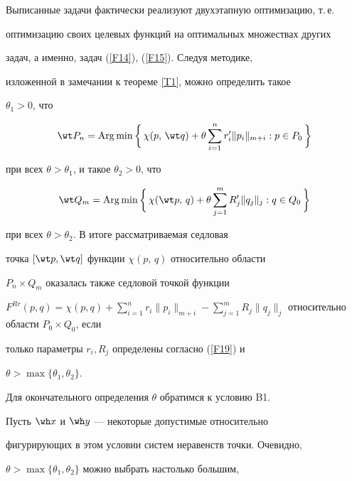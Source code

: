 Выписанные задачи фактически реализуют двухэтапную оптимизацию, т.\,е.{}


оптимизацию своих целевых функций на оптимальных множествах других


задач, а именно, задач (\ref{F14}), (\ref{F15}). Следуя методике,\


изложенной в замечании к теореме \ref{T1}, можно определить такое


$\theta_1>0$, что


\begin{equation}


\label{F17}


\wt P_n=\Arg\min\bigg\{\, \chi(p,\,\wt q)+\theta \sum^n_{i=1}


r'_i\| p_i\|_{m+i}: p\in P_0\,\bigg\}


\end{equation}


при всех $\theta>\theta_1$, и такое $\theta_2>0$, что


\begin{equation}


\label{F18}


\wt Q_m=\Arg\min\bigg\{\, \chi(\wt p,\,q)+\theta \sum\limits^m_{j=1}


R'_j\| q_j\|_j: q\in Q_0\,\bigg\}


\end{equation}


при всех $\theta>\theta_2$. В итоге рассматриваемая седловая


точка $[\wt p,\wt q]$ функции $\chi(p,\,q)$ относительно области


$P_n\times Q_m$ оказалась также седловой точкой функции


$F^{Rr}(p,q)=\chi(p,q)+\sum\limits^n_{i=1}r_i\|p_i\|_{m+i}-


\sum\limits^m_{j=1}R_j\|q_j\|_j$ относительно области $P_0\times Q_0$, если


только параметры $r_i, R_j$ определены согласно (\ref{F19}) и


$\theta>\max\{\theta_1,\theta_2\}$.





Для окончательного определения $\theta$ обратимся к условию B1.


Пусть $\wh x$ и $\wh y$ --- некоторые допустимые относительно


фигурирующих в этом условии систем неравенств точки. Очевидно,


$\theta>\max\{\theta_1,\theta_2\}$ можно выбрать настолько большим,



